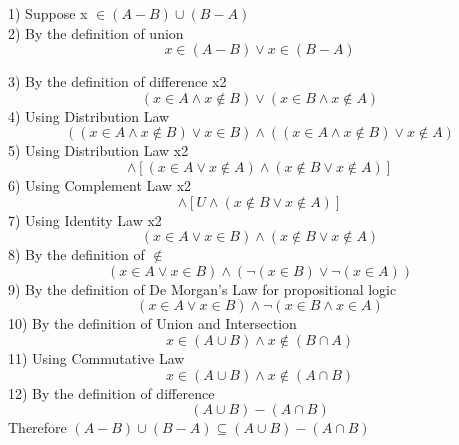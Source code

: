 \documentclass[a4paper,12pt]{article}
\begin{document}
\begin{tcolorbox}
1)
Suppose  x $\in  (A - B) \cup (B - A)$ \\

2) By the definition of union
\begin{displaymath}
x\in(A-B) \vee x \in (B-A)
\end{displaymath}

3) By the definition of difference x2
\begin{displaymath}
 (x \in A \wedge x \not\in B) \vee  (x \in B \wedge x \not\in A) 
\end{displaymath}
4) Using Distribution Law 
\begin{displaymath}
((x\in A \wedge x\not\in B) \vee x \in B) \wedge ((x\in A \wedge x\not\in B) \vee x \not\in A) 
\end{displaymath}
5) Using Distribution Law x2
\begin{displaymath}
[(x\in A \vee x \in B) \wedge (x\not\in B \vee x\in B)] \wedge
[(x\in A \vee x \not\in A) \wedge (x\not\in B \vee x\not\in A)]
\end{displaymath}
6) Using Complement Law x2
\begin{displaymath}
[(x\in A \vee x \in B) \wedge U] \wedge
[U \wedge (x\not\in B \vee x\not\in A)]
\end{displaymath}
7) Using Identity Law x2
\begin{displaymath}
(x\in A \vee x \in B) \wedge
(x\not\in B \vee x\not\in A)
\end{displaymath}
8) By the definition of $\not\in$
\begin{displaymath}
(x \in A \vee  x \in B) \wedge (\neg (x \in B) \vee \neg(x\in A))
\end{displaymath}
9) By the definition of De Morgan's Law for propositional logic
\begin{displaymath}
(x \in A \vee  x \in B) \wedge \neg (x \in B \wedge x\in A)
\end{displaymath}
10) By the definition of Union and Intersection
\begin{displaymath}
 x \in (A \cup B) \wedge x \not\in (B \cap A)
\end{displaymath}
11) Using Commutative Law
\begin{displaymath}
 x \in (A \cup B) \wedge x \not\in (A \cap B)
\end{displaymath}
12) By the definition of difference
\begin{displaymath}
 (A \cup B)-(A \cap B)
\end{displaymath}
Therefore $(A - B) \cup (B - A) \subseteq (A \cup B) - (A \cap B)$
\end{tcolorbox}
\end{document}
